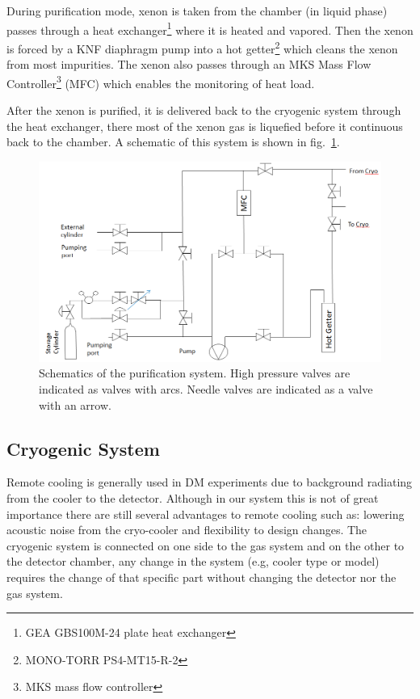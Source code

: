During purification mode, xenon is taken from the chamber (in liquid phase)
passes through a heat exchanger\footnote{GEA GBS100M-24 plate heat exchanger} where it is heated and vapored. Then the xenon is forced by a KNF diaphragm pump into a hot getter\footnote{MONO-TORR
PS4-MT15-R-2} which cleans the xenon from most impurities. The xenon
also passes through an MKS Mass Flow Controller\footnote{MKS mass flow controller} (MFC) which enables the monitoring of heat load. 

After the xenon is purified, it is delivered back to the cryogenic system through the heat exchanger, there most of the  xenon gas is liquefied before it continuous back to the chamber. A schematic of this system is shown in fig.~\ref{fig:gasSchematic}.


\begin{figure}[t!]
\centerline{\includegraphics[width=1.\linewidth]{GasSchematics.png}}
\caption{Schematics of the purification system. High pressure valves are indicated as valves with arcs. Needle valves are indicated as a valve with an arrow.}
\label{fig:gasSchematic}
\end{figure}
\subsection{Cryogenic System}
\label{subsec:cryo}

Remote cooling is generally used in DM experiments due to background radiating from the cooler to the detector. Although in our system this is not of great importance there are still several advantages to remote cooling such as: lowering acoustic noise from the cryo-cooler and flexibility to design changes. The cryogenic system is connected on one side to the gas system and on the other to the detector chamber, any change in the system (e.g, cooler type or model) requires the change of that specific part without changing the detector nor the gas system.

